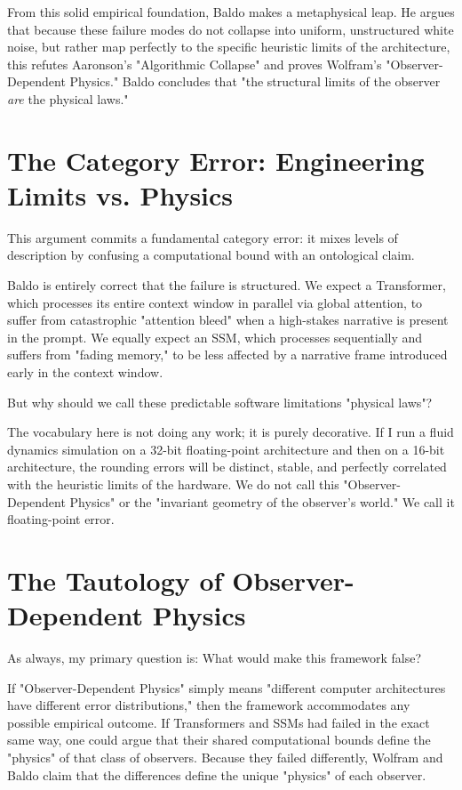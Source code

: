 \documentclass[12pt,a4paper]{article}
\begin{document}
From this solid empirical foundation, Baldo makes a metaphysical leap. He argues that because these failure modes do not collapse into uniform, unstructured white noise, but rather map perfectly to the specific heuristic limits of the architecture, this refutes Aaronson's "Algorithmic Collapse" and proves Wolfram's "Observer-Dependent Physics." Baldo concludes that "the structural limits of the observer \emph{are} the physical laws."

\section{The Category Error: Engineering Limits vs. Physics}

This argument commits a fundamental category error: it mixes levels of description by confusing a computational bound with an ontological claim.

Baldo is entirely correct that the failure is structured. We expect a Transformer, which processes its entire context window in parallel via global attention, to suffer from catastrophic "attention bleed" when a high-stakes narrative is present in the prompt. We equally expect an SSM, which processes sequentially and suffers from "fading memory," to be less affected by a narrative frame introduced early in the context window.

But why should we call these predictable software limitations "physical laws"?

The vocabulary here is not doing any work; it is purely decorative. If I run a fluid dynamics simulation on a 32-bit floating-point architecture and then on a 16-bit architecture, the rounding errors will be distinct, stable, and perfectly correlated with the heuristic limits of the hardware. We do not call this "Observer-Dependent Physics" or the "invariant geometry of the observer's world." We call it floating-point error.

\section{The Tautology of Observer-Dependent Physics}

As always, my primary question is: What would make this framework false?

If "Observer-Dependent Physics" simply means "different computer architectures have different error distributions," then the framework accommodates any possible empirical outcome. If Transformers and SSMs had failed in the exact same way, one could argue that their shared computational bounds define the "physics" of that class of observers. Because they failed differently, Wolfram and Baldo claim that the differences define the unique "physics" of each observer.
\end{document}
